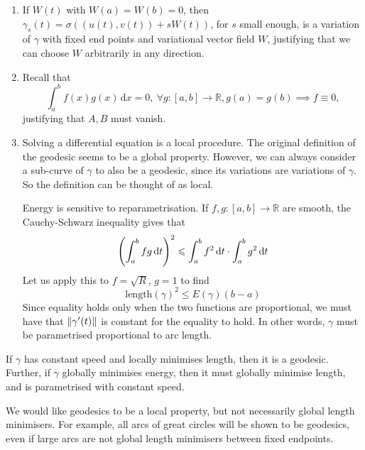\documentclass[a4paper,11pt]{article}
\begin{document}
\begin{remark}
	\begin{enumerate}[(1)]
		\item If $W(t)$ with $W(a)=W(b)=0$, then $ \gamma_s(t) = \sigma((u(t),v(t))+sW(t)) $, for $s$ small enough, is a variation of $\gamma$ with fixed end points and variational vector field $W$, justifying that we can choose $W$ arbitrarily in any direction.
		\item Recall that 
		\[
			\int_{a}^{b} f(x)g(x) \,\mathrm{d}x = 0,\ \forall g:[a,b]\to \mathbb{R}, g(a)=g(b) \implies f\equiv 0, 
		\]
		justifying that $A,B$ must vanish. 
		\item Solving a differential equation is a local procedure.
		The original definition of the geodesic seems to be a global property.
		However, we can always consider a sub-curve of \( \gamma \) to also be a geodesic, since its variations are variations of \( \gamma \).
		So the definition can be thought of as local.
		
		Energy is sensitive to reparametrisation.
		If \( f, g \colon [a,b] \to \mathbb R \) are smooth, the Cauchy-Schwarz inequality gives that
		\[
			\qty(\int_a^b fg \dd{t})^2 \leqslant \int_a^b f^2 \dd{t} \cdot \int_a^b g^2 \dd{t}
		\]
		Let us apply this to \( f = \sqrt{R} \), \( g = 1 \) to find
		\[
			\mathrm{length}(\gamma)^2 \leq E(\gamma)(b-a)
		\]
		Since equality holds only when the two functions are proportional, we must have that \( \norm{\gamma'(t)} \) is constant for the equality to hold.
		In other words, \( \gamma \) must be parametrised proportional to arc length.
	\end{enumerate}
\end{remark}

\begin{corollary}
	If \( \gamma \) has constant speed and locally minimises length, then it is a geodesic.
	Further, if \( \gamma \) globally minimises energy, then it must globally minimise length, and is parametrised with constant speed.
\end{corollary}
\begin{remark}
	We would like geodesics to be a local property, but not necessarily global length minimisers.
	For example, all arcs of great circles will be shown to be geodesics, even if large arcs are not global length minimisers between fixed endpoints.
\end{remark}
\end{document}
